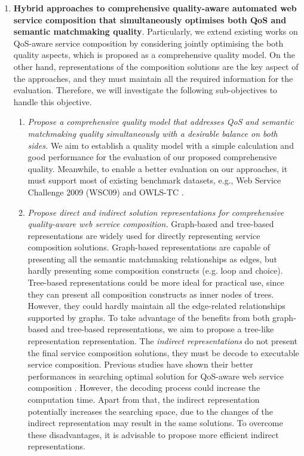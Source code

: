 \begin{enumerate}
  \item \label{Obj:1} \textbf{Hybrid approaches to comprehensive quality-aware automated web service composition that simultaneously optimises both QoS and semantic matchmaking quality}. Particularly, we extend existing works on QoS-aware service composition by considering jointly optimising the both quality aspects, which is proposed as a comprehensive quality model. On the other hand, representations of the composition solutions are the key aspect of the approaches, and they must maintain all the required information for the evaluation. Therefore, we will investigate the following sub-objectives to handle this objective.
  \begin{enumerate}
    \item \emph{Propose a comprehensive quality model that addresses QoS and semantic matchmaking quality simultaneously with a desirable balance on both sides.} We aim to establish a quality model with a simple calculation and good performance for the evaluation of our proposed comprehensive quality. Meanwhile, to enable a better evaluation on our approaches, it must support most of existing benchmark datasets, e.g., Web Service Challenge 2009 (WSC09)\cite{kona2009wsc} and OWLS-TC \cite{kuster2008opossum}.
    
    \item \emph{Propose direct and indirect solution representations for comprehensive quality-aware web service composition.} Graph-based and tree-based representations are widely used for directly representing service composition solutions. Graph-based representations are capable of presenting all the semantic matchmaking relationships as edges, but hardly presenting some composition constructs (e.g. loop and choice). Tree-based representations could be more ideal for practical use, since they can present all composition constructs as inner nodes of trees. However, they could hardly maintain all the edge-related relationships supported by graphs. To take advantage of the benefits from both graph-based and tree-based representations, we aim to propose a tree-like representation representation. The \emph{indirect representations} do not present the final service composition solutions, they must be decode to executable service composition. Previous studies have shown their better performances in searching optimal solution for QoS-aware web service composition \cite{da2016memetic,da2016particle}. However, the decoding process could increase the computation time. Apart from that, the indirect representation potentially increases the searching space, due to the changes of the indirect representation may result in the same solutions. To overcome these disadvantages, it is advisable to propose more efficient indirect representations.
    

\end{enumerate}
\end{enumerate}
